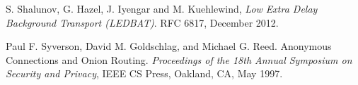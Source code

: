 \documentclass[conference,letterpaper]{IEEEtran}
\begin{document}
\begin{thebibliography}{99}
  S. Shalunov, G. Hazel, J. Iyengar and M. Kuehlewind,
  \emph{Low Extra Delay Background Transport (LEDBAT)}.
  RFC 6817,
  December 2012.

 Paul F. Syverson, David M. Goldschlag, and Michael
  G. Reed.  Anonymous Connections and Onion Routing.
  \emph{Proceedings of the 18th Annual Symposium on Security and
    Privacy}, IEEE CS Press, Oakland, CA, May 1997.

\end{thebibliography}
\end{document}
